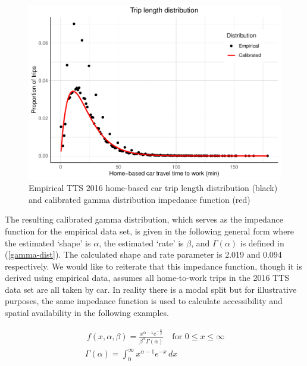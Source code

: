 \documentclass[]{elsarticle} %
\begin{document}
\begin{figure}
\includegraphics[width=1\linewidth]{Spatial-Availability_files/figure-latex/TLD-Gamma-plot-1} \caption{\label{fig:TLD-Gamma-plot}Empirical TTS 2016 home-based car trip length distribution (black) and calibrated gamma distribution impedance function (red)}\label{fig:TLD-Gamma-plot}
\end{figure}

The resulting calibrated gamma distribution, which serves as the
impedance function for the empirical data set, is given in the following
general form where the estimated `shape' is \(\alpha\), the estimated
`rate' is \(\beta\), and \(\Gamma(\alpha)\) is defined in
(\ref{gamma-dist}). The calculated shape and rate parameter is 2.019 and
0.094 respectively. We would like to reiterate that this impedance
function, though it is derived using empirical data, assumes all
home-to-work trips in the 2016 TTS data set are all taken by car. In
reality there is a modal split but for illustrative purposes, the same
impedance function is used to calculate accessibility and spatial
availability in the following examples.

\begin{equation}
\label{gamma-dist}
\begin{array}{l}\ 
f(x, \alpha, \beta) = \frac {x^{\alpha-1}e^{-\frac{x}{\beta}}}{ \beta^{\alpha}\Gamma(\alpha)} \quad \text{for } 0 \leq x \leq \infty\\

\Gamma(\alpha) =  \int_{0}^{\infty} x^{\alpha-1}e^{-x} \,dx\\
\end{array}
\end{equation}
\end{document}
